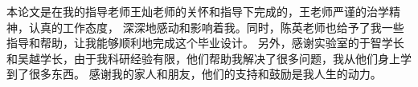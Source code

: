 \begin{thanks}

    本论文是在我的指导老师王灿老师的关怀和指导下完成的，王老师严谨的治学精神，认真的工作态度，
    深深地感动和影响着我。同时，陈英老师也给予了我一些指导和帮助，让我能够顺利地完成这个毕业设计。
    另外，感谢实验室的于智学长和吴越学长，由于我科研经验有限，他们帮助我解决了很多问题，我从他们身上学到了很多东西。
    感谢我的家人和朋友，他们的支持和鼓励是我人生的动力。

\end{thanks}
